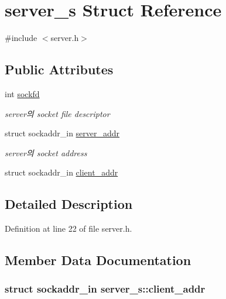 \hypertarget{structserver__s}{\section{server\-\_\-s Struct Reference}
\label{structserver__s}
}


{\ttfamily \#include $<$server.\-h$>$}

\subsection*{Public Attributes}
\begin{DoxyCompactItemize}
\item 
int \hyperlink{structserver__s_a7109ed4db0376f7de840d82c4379099d}{sockfd}
\begin{DoxyCompactList}\small\item\em server의 socket file descriptor \end{DoxyCompactList}\item 
struct sockaddr\-\_\-in \hyperlink{structserver__s_aa49ed3594b99b1da4de179995dfa553d}{server\-\_\-addr}
\begin{DoxyCompactList}\small\item\em server의 socket address \end{DoxyCompactList}\item 
struct sockaddr\-\_\-in \hyperlink{structserver__s_a542d49f8aee930024091c320530d8dbf}{client\-\_\-addr}
\end{DoxyCompactItemize}


\subsection{Detailed Description}


Definition at line 22 of file server.\-h.



\subsection{Member Data Documentation}
\hypertarget{structserver__s_a542d49f8aee930024091c320530d8dbf}{
\subsubsection[{client\-\_\-addr}]{\setlength{\rightskip}{0pt plus 5cm}struct sockaddr\-\_\-in server\-\_\-s\-::client\-\_\-addr}}\label{structserver__s_a542d49f8aee930024091c320530d8dbf}


